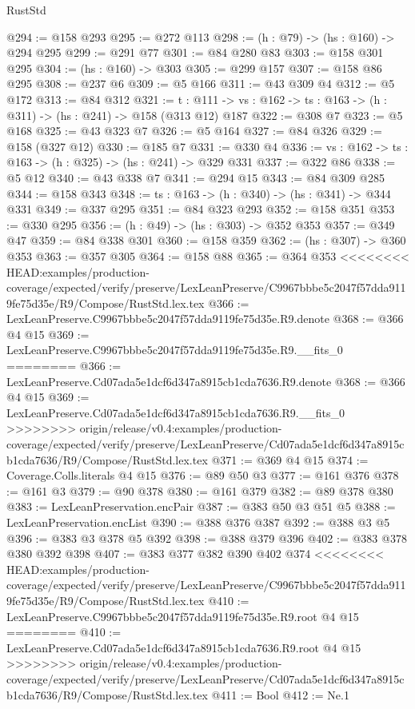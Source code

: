 \begin{lexlean}{RustStd}
\begin{coremodule}
{\begin{coremodule}
@294 := @158 @293
@295 := @272 @113
@298 := (h : @79) -> (hs : @160) -> @294 @295
@299 := @291 @77
@301 := @84 @280 @83
@303 := @158 @301 @295
@304 := (hs : @160) -> @303
@305 := @299 @157
@307 := @158 @86 @295
@308 := @237 @6
@309 := @5 @166
@311 := @43 @309 @4
@312 := @5 @172
@313 := @84 @312
@321 := {t : @111} ->
  {vs : @162} -> {ts : @163} -> (h : @311) -> (hs : @241) -> @158 (@313 @12) @187
@322 := @308 @7
@323 := @5 @168
@325 := @43 @323 @7
@326 := @5 @164
@327 := @84 @326
@329 := @158 (@327 @12)
@330 := @185 @7
@331 := @330 @4
@336 := {vs : @162} -> {ts : @163} -> (h : @325) -> (hs : @241) -> @329 @331
@337 := @322 @86
@338 := @5 @12
@340 := @43 @338 @7
@341 := @294 @15
@343 := @84 @309 @285
@344 := @158 @343
@348 := {ts : @163} -> (h : @340) -> (hs : @341) -> @344 @331
@349 := @337 @295
@351 := @84 @323 @293
@352 := @158 @351
@353 := @330 @295
@356 := (h : @49) -> (hs : @303) -> @352 @353
@357 := @349 @47
@359 := @84 @338 @301
@360 := @158 @359
@362 := (hs : @307) -> @360 @353
@363 := @357 @305
@364 := @158 @88
@365 := @364 @353
<<<<<<<< HEAD:examples/production-coverage/expected/verify/preserve/LexLeanPreserve/C9967bbbe5c2047f57dda9119fe75d35e/R9/Compose/RustStd.lex.tex
@366 := LexLeanPreserve.C9967bbbe5c2047f57dda9119fe75d35e.R9.denote
@368 := @366 @4 @15
@369 := LexLeanPreserve.C9967bbbe5c2047f57dda9119fe75d35e.R9.__fits_0
========
@366 := LexLeanPreserve.Cd07ada5e1dcf6d347a8915cb1cda7636.R9.denote
@368 := @366 @4 @15
@369 := LexLeanPreserve.Cd07ada5e1dcf6d347a8915cb1cda7636.R9.__fits_0
>>>>>>>> origin/release/v0.4:examples/production-coverage/expected/verify/preserve/LexLeanPreserve/Cd07ada5e1dcf6d347a8915cb1cda7636/R9/Compose/RustStd.lex.tex
@371 := @369 @4 @15
@374 := Coverage.Colls.literals @4 @15
@376 := @89 @50 @3
@377 := @161 @376
@378 := @161 @3
@379 := @90 @378
@380 := @161 @379
@382 := @89 @378 @380
@383 := LexLeanPreservation.encPair
@387 := @383 @50 @3 @51 @5
@388 := LexLeanPreservation.encList
@390 := @388 @376 @387
@392 := @388 @3 @5
@396 := @383 @3 @378 @5 @392
@398 := @388 @379 @396
@402 := @383 @378 @380 @392 @398
@407 := @383 @377 @382 @390 @402 @374
<<<<<<<< HEAD:examples/production-coverage/expected/verify/preserve/LexLeanPreserve/C9967bbbe5c2047f57dda9119fe75d35e/R9/Compose/RustStd.lex.tex
@410 := LexLeanPreserve.C9967bbbe5c2047f57dda9119fe75d35e.R9.root @4 @15
========
@410 := LexLeanPreserve.Cd07ada5e1dcf6d347a8915cb1cda7636.R9.root @4 @15
>>>>>>>> origin/release/v0.4:examples/production-coverage/expected/verify/preserve/LexLeanPreserve/Cd07ada5e1dcf6d347a8915cb1cda7636/R9/Compose/RustStd.lex.tex
@411 := Bool
@412 := Ne.{1}

\end{coremodule}}
\end{coremodule}
\end{lexlean}
